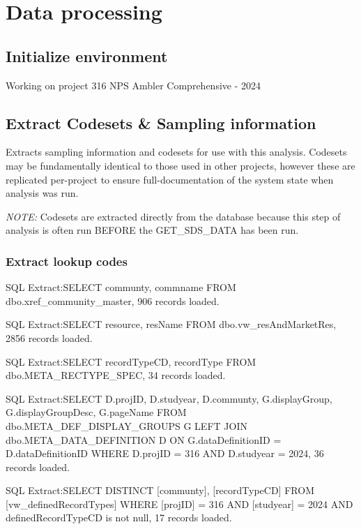 \documentclass[
]{article}
\begin{document}
\section{Data processing}\label{data-processing}

\subsection{Initialize environment}\label{initialize-environment}

Working on project 316 NPS Ambler Comprehensive - 2024

\subsection{Extract Codesets \& Sampling
information}\label{extract-codesets-sampling-information}

Extracts sampling information and codesets for use with this analysis.
Codesets may be fundamentally identical to those used in other projects,
however these are replicated per-project to ensure full-documentation of
the system state when analysis was run.

\emph{NOTE:} Codesets are extracted directly from the database because
this step of analysis is often run BEFORE the GET\_SDS\_DATA has been
run.

\subsubsection{Extract lookup codes}\label{extract-lookup-codes}

SQL Extract:SELECT communty, commname FROM dbo.xref\_community\_master,
906 records loaded.

SQL Extract:SELECT resource, resName FROM dbo.vw\_resAndMarketRes, 2856
records loaded.

SQL Extract:SELECT recordTypeCD, recordType FROM
dbo.META\_RECTYPE\_SPEC, 34 records loaded.

SQL Extract:SELECT D.projID, D.studyear, D.communty, G.displayGroup,
G.displayGroupDesc, G.pageName FROM dbo.META\_DEF\_DISPLAY\_GROUPS G
LEFT JOIN dbo.META\_DATA\_DEFINITION D ON G.dataDefinitionID =
D.dataDefinitionID WHERE D.projID = 316 AND D.studyear = 2024, 36
records loaded.

SQL Extract:SELECT DISTINCT {[}communty{]}, {[}recordTypeCD{]} FROM
{[}vw\_definedRecordTypes{]} WHERE {[}projID{]} = 316 AND {[}studyear{]}
= 2024 AND definedRecordTypeCD is not null, 17 records loaded.
\end{document}
